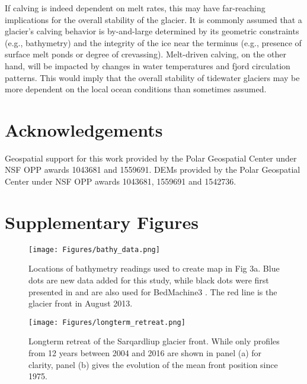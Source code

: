 \documentclass[10pt,letterpaper]{article}
\begin{document}
 
 If calving is indeed dependent on melt rates, this may have far-reaching implications for the overall stability of the glacier. It is commonly assumed that a glacier's calving behavior is by-and-large determined by its geometric constraints (e.g., bathymetry) and the integrity of the ice near the terminus (e.g., presence of surface melt ponds or degree of crevassing). Melt-driven calving, on the other hand, will be impacted by changes in water temperatures and fjord circulation patterns. This would imply that the overall stability of tidewater glaciers may be more dependent on the local ocean conditions than sometimes assumed.

\section{Acknowledgements}
Geospatial support for this work provided by the Polar Geospatial Center under NSF OPP awards 1043681 and 1559691. DEMs provided by the Polar Geospatial Center under NSF OPP awards 1043681, 1559691 and 1542736.

\vspace{.2in}
% 
 
% 
  

\clearpage

\section*{Supplementary Figures}

\setcounter{figure}{0}    
  \begin{figure*}[h!]
 \begin{centering}
  \texttt{[image: Figures/bathy\_data.png]}
  \caption{Locations of bathymetry readings used to create map in Fig 3a. Blue dots are new data added for this study, while black dots were first presented in \cite{Stevens:2016tx} and are also used for BedMachine3 \cite{Morlighem:2017fd}. The red line is the glacier front in August 2013.}
  \label{fig:bathy_data}
  \end{centering}
\end{figure*}

  \begin{figure*}[h]
 \begin{center}
  \texttt{[image: Figures/longterm\_retreat.png]}
  \caption{Longterm retreat of the Sarqardliup glacier front. While only profiles from 12 years between 2004 and 2016 are shown in panel (a) for clarity, panel (b) gives the evolution of the mean front position since 1975.}
  \label{fig:longterm_retreat}
  \end{center}
\end{figure*}
\end{document}
